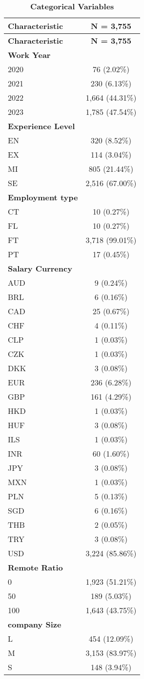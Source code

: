 \documentclass[
]{article}
\begin{document}
\begin{longtable}[]{@{}lc@{}}
\caption{\textbf{Categorical Variables}}\tabularnewline
\toprule\noalign{}
\textbf{Characteristic} & \textbf{N = 3,755} \\
\midrule\noalign{}
\endfirsthead
\toprule\noalign{}
\textbf{Characteristic} & \textbf{N = 3,755} \\
\midrule\noalign{}
\endhead
\bottomrule\noalign{}
\endlastfoot
\textbf{Work Year} & \\
2020 & 76 (2.02\%) \\
2021 & 230 (6.13\%) \\
2022 & 1,664 (44.31\%) \\
2023 & 1,785 (47.54\%) \\
\textbf{Experience Level} & \\
EN & 320 (8.52\%) \\
EX & 114 (3.04\%) \\
MI & 805 (21.44\%) \\
SE & 2,516 (67.00\%) \\
\textbf{Employment type} & \\
CT & 10 (0.27\%) \\
FL & 10 (0.27\%) \\
FT & 3,718 (99.01\%) \\
PT & 17 (0.45\%) \\
\textbf{Salary Currency} & \\
AUD & 9 (0.24\%) \\
BRL & 6 (0.16\%) \\
CAD & 25 (0.67\%) \\
CHF & 4 (0.11\%) \\
CLP & 1 (0.03\%) \\
CZK & 1 (0.03\%) \\
DKK & 3 (0.08\%) \\
EUR & 236 (6.28\%) \\
GBP & 161 (4.29\%) \\
HKD & 1 (0.03\%) \\
HUF & 3 (0.08\%) \\
ILS & 1 (0.03\%) \\
INR & 60 (1.60\%) \\
JPY & 3 (0.08\%) \\
MXN & 1 (0.03\%) \\
PLN & 5 (0.13\%) \\
SGD & 6 (0.16\%) \\
THB & 2 (0.05\%) \\
TRY & 3 (0.08\%) \\
USD & 3,224 (85.86\%) \\
\textbf{Remote Ratio} & \\
0 & 1,923 (51.21\%) \\
50 & 189 (5.03\%) \\
100 & 1,643 (43.75\%) \\
\textbf{company Size} & \\
L & 454 (12.09\%) \\
M & 3,153 (83.97\%) \\
S & 148 (3.94\%) \\
\end{longtable}
\end{document}
